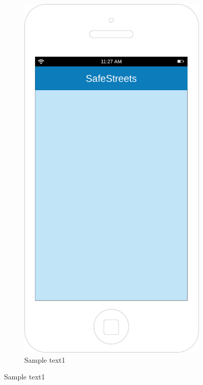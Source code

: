 \documentclass[12pt,a4paper]{report}
\begin{document}
\begin{figure}[h]
		\begin{subfigure}{0.5\textwidth}
			\includegraphics[scale=0.25, center]{Background}
			\caption{Sample text1}
			\label{fig:subim1}
		\end{subfigure}
		\end{figure}
\end{document}
